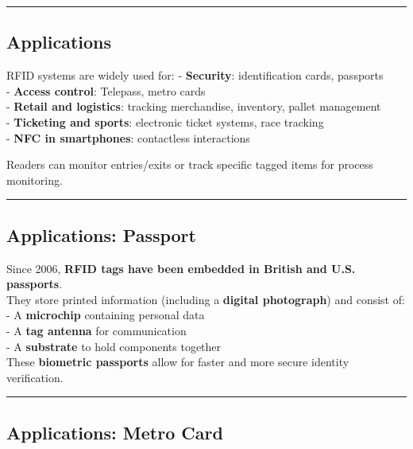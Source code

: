 \documentclass[a4paper, 12pt]{book} %
\begin{document}
\begin{center}\rule{0.5\linewidth}{0.5pt}\end{center}

\subsection{Applications}\label{applications}

RFID systems are widely used for: - \textbf{Security}: identification
cards, passports\\
- \textbf{Access control}: Telepass, metro cards\\
- \textbf{Retail and logistics}: tracking merchandise, inventory, pallet
management\\
- \textbf{Ticketing and sports}: electronic ticket systems, race
tracking\\
- \textbf{NFC in smartphones}: contactless interactions

Readers can monitor entries/exits or track specific tagged items for
process monitoring.

\begin{center}\rule{0.5\linewidth}{0.5pt}\end{center}

\subsection{Applications: Passport}\label{applications-passport}

Since 2006, \textbf{RFID tags have been embedded in British and U.S.
passports}.\\
They store printed information (including a \textbf{digital photograph})
and consist of: - A \textbf{microchip} containing personal data\\
- A \textbf{tag antenna} for communication\\
- A \textbf{substrate} to hold components together\\
These \textbf{biometric passports} allow for faster and more secure
identity verification.

\begin{center}\rule{0.5\linewidth}{0.5pt}\end{center}

\subsection{Applications: Metro Card}\label{applications-metro-card}
\end{document}
